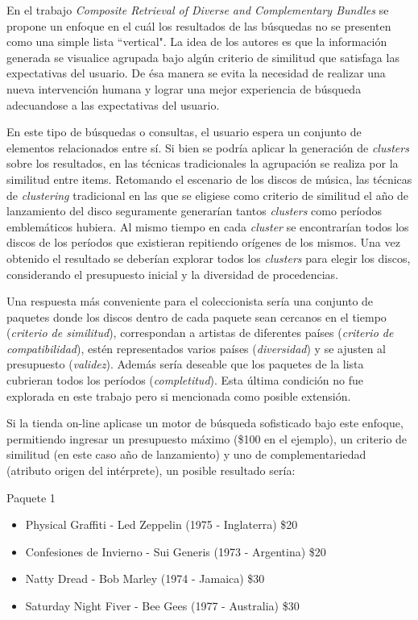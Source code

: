 En el trabajo {\em Composite Retrieval of Diverse and Complementary Bundles} \cite{journals/tkde/Amer-YahiaBCFMZ14} se propone un enfoque en el cuál los resultados de las búsquedas no se presenten como una simple lista ``vertical". La idea de los autores es que la información generada se visualice agrupada bajo algún criterio de similitud que satisfaga las expectativas del usuario. De ésa manera se evita la necesidad de realizar una nueva intervención humana y lograr una mejor experiencia de búsqueda adecuandose a las expectativas del usuario.

En este tipo de búsquedas o consultas, el usuario espera un conjunto de elementos relacionados entre sí. Si bien se podría aplicar la generación de {\em clusters} sobre los resultados, en las técnicas tradicionales la agrupación se realiza por la similitud entre items. Retomando el escenario de los discos de música, las técnicas de {\em clustering} tradicional en las que se eligiese como criterio de similitud el año de lanzamiento del disco seguramente generarían tantos {\em clusters} como períodos emblemáticos hubiera. Al mismo tiempo en cada {\em cluster} se encontrarían todos los discos de los períodos que existieran repitiendo orígenes de los mismos. Una vez obtenido el resultado se deberían explorar todos los {\em clusters} para elegir los discos, considerando el presupuesto inicial y la diversidad de procedencias.

Una respuesta más conveniente para el coleccionista sería una conjunto de paquetes donde los discos dentro de cada paquete sean cercanos en el tiempo ({\em criterio de similitud}), correspondan a artistas de diferentes países ({\em criterio de compatibilidad}), estén representados varios países ({\em diversidad}) y se ajusten al presupuesto ({\em validez}). Además sería deseable que los paquetes de la lista cubrieran todos los períodos ({\em completitud}). Esta última condición no fue explorada en este trabajo pero si mencionada como posible extensión.

Si la tienda on-line aplicase un motor de búsqueda sofisticado bajo este enfoque, permitiendo ingresar un presupuesto máximo (\$100 en el ejemplo), un criterio de similitud (en este caso año de lanzamiento) y uno de complementariedad (atributo origen del intérprete), un posible resultado sería:

\begin{mybox}{Paquete 1}
	\begin{itemize}
		\item {\scriptsize Physical Graffiti - Led Zeppelin (1975 - Inglaterra) \$20}
		\item {\scriptsize Confesiones de Invierno - Sui Generis (1973 - Argentina) \$20}
		\item {\scriptsize Natty Dread - Bob Marley (1974 - Jamaica) \$30}
		\item {\scriptsize Saturday Night Fiver - Bee Gees (1977 - Australia) \$30}
	\end{itemize}
\end{mybox}


